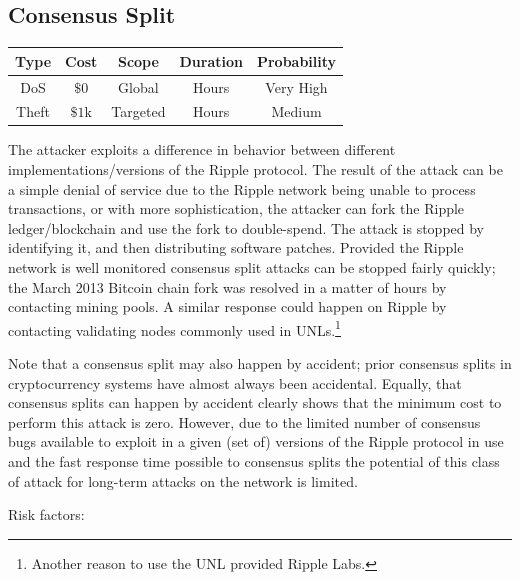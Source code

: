 \documentclass{article}
\begin{document}
\subsection{Consensus Split}

\begin{center}
    \begin{tabular}{c|c|c|c|c}
        Type & Cost & Scope & Duration & Probability \\ \hline
        DoS   & $\$0$ & Global & Hours & Very High \\
        Theft & $\$1\text{k}$ & Targeted & Hours & Medium
    \end{tabular}
\end{center}

The attacker exploits a difference in behavior between different
implementations/versions of the Ripple protocol. The result of the attack can
be a simple denial of service due to the Ripple network being unable to process
transactions, or with more sophistication, the attacker can fork the Ripple
ledger/blockchain and use the fork to double-spend. The attack is stopped by
identifying it, and then distributing software patches. Provided the Ripple
network is well monitored consensus split attacks can be stopped fairly
quickly; the March 2013 Bitcoin chain fork\cite{bip50} was resolved in a matter
of hours by contacting mining pools. A similar response could happen on Ripple
by contacting validating nodes commonly used in UNLs.\footnote{Another reason
to use the UNL provided Ripple Labs.}

Note that a consensus split may also happen by accident; prior consensus splits
in cryptocurrency systems have almost always been accidental. Equally, that
consensus splits can happen by accident clearly shows that the minimum cost to
perform this attack is zero. However, due to the limited number of consensus
bugs available to exploit in a given (set of) versions of the Ripple protocol
in use and the fast response time possible to consensus splits the potential of
this class of attack for long-term attacks on the network is limited.

Risk factors:
\end{document}

